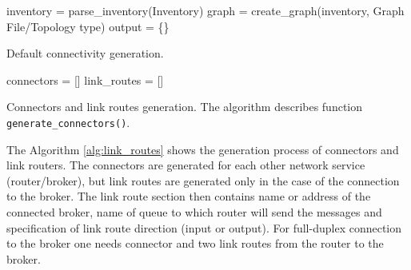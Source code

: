 \begin{center}
	\begin{algorithm}[H]
		\LinesNumbered
		\DontPrintSemicolon


		\var inventory = parse\_inventory(Inventory)\;
		\var graph = create\_graph(inventory, Graph File/Topology type)\;
		\var output = \{\}\;

		 \caption{Default connectivity generation.}
		 \label{alg:default_connections}
	\end{algorithm}
\end{center}

\begin{center}
	\begin{algorithm}[H]
		\LinesNumbered
		\DontPrintSemicolon


		\var connectors = []\;
		\var link\_routes = []\;
		 \caption{Connectors and link routes generation. The algorithm describes function \texttt{generate\_connectors()}.}
		 \label{alg:link_routes}
	\end{algorithm}
\end{center}

The Algorithm \ref{alg:link_routes} shows the generation process of connectors and link routers. The connectors are generated for each other network service (router/broker), but link routes are generated only in the case of the connection to the broker. The link route section then contains name or address of the connected broker, name of queue to which router will send the messages and specification of link route direction (input or output). For full-duplex connection to the broker one needs connector and two link routes from the router to the broker.

